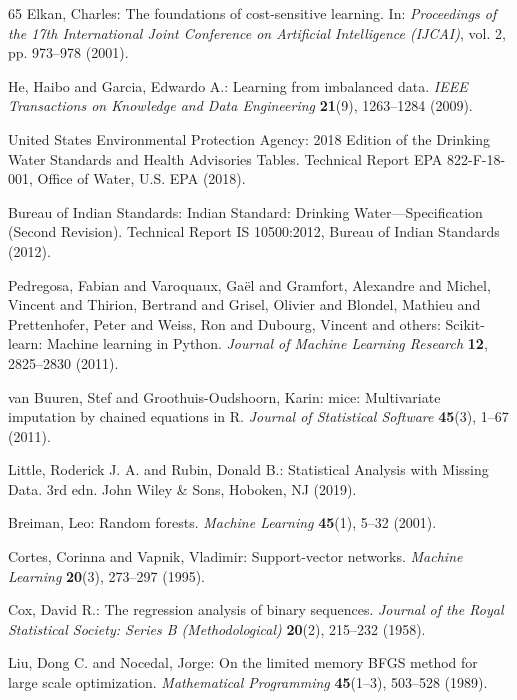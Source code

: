 \documentclass[pdflatex,sn-mathphys-num]{sn-jnl}%
\theoremstyle{thmstyleone}%
\theoremstyle{thmstyletwo}%
\theoremstyle{thmstylethree}%
\begin{document}
\begin{thebibliography}{65}
Elkan, Charles: The foundations of cost-sensitive learning.
In: \textit{Proceedings of the 17th International Joint Conference on Artificial Intelligence (IJCAI)}, vol. 2, pp. 973--978 (2001).

He, Haibo and Garcia, Edwardo A.: Learning from imbalanced data.
\textit{IEEE Transactions on Knowledge and Data Engineering} \textbf{21}(9), 1263--1284 (2009).

United States Environmental Protection Agency: 2018 Edition of the Drinking Water Standards and Health Advisories Tables.
Technical Report EPA 822-F-18-001, Office of Water, U.S. EPA (2018).

Bureau of Indian Standards: Indian Standard: Drinking Water---Specification (Second Revision).
Technical Report IS 10500:2012, Bureau of Indian Standards (2012).

Pedregosa, Fabian and Varoquaux, Ga{\"e}l and Gramfort, Alexandre and Michel, Vincent and Thirion, Bertrand and Grisel, Olivier and Blondel, Mathieu and Prettenhofer, Peter and Weiss, Ron and Dubourg, Vincent and others: Scikit-learn: Machine learning in Python.
\textit{Journal of Machine Learning Research} \textbf{12}, 2825--2830 (2011).

van Buuren, Stef and Groothuis-Oudshoorn, Karin: mice: Multivariate imputation by chained equations in R.
\textit{Journal of Statistical Software} \textbf{45}(3), 1--67 (2011).

Little, Roderick J. A. and Rubin, Donald B.: Statistical Analysis with Missing Data.
3rd edn. John Wiley \& Sons, Hoboken, NJ (2019).

Breiman, Leo: Random forests.
\textit{Machine Learning} \textbf{45}(1), 5--32 (2001).

Cortes, Corinna and Vapnik, Vladimir: Support-vector networks.
\textit{Machine Learning} \textbf{20}(3), 273--297 (1995).

Cox, David R.: The regression analysis of binary sequences.
\textit{Journal of the Royal Statistical Society: Series B (Methodological)} \textbf{20}(2), 215--232 (1958).

Liu, Dong C. and Nocedal, Jorge: On the limited memory BFGS method for large scale optimization.
\textit{Mathematical Programming} \textbf{45}(1--3), 503--528 (1989).


\end{thebibliography}
\end{document}
